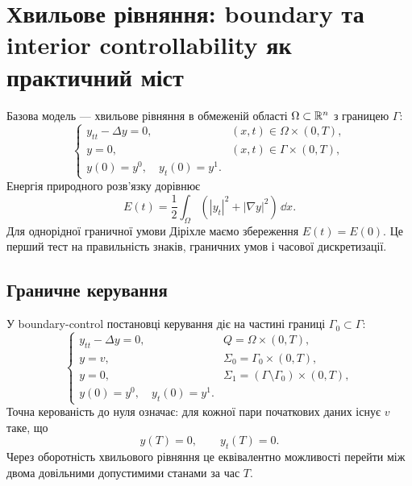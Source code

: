\chapter{Хвильове рівняння: boundary та interior controllability як практичний міст}
\label{chap:wave-boundary-interior-bridge}


Базова модель --- хвильове рівняння в обмеженій області $\Omega\subset\mathbb{R}^n$ з границею $\Gamma$:
\begin{equation}
\begin{cases}
 y_{tt}-\Delta y = 0, & (x,t)\in \Omega\times(0,T),\\
 y = 0, & (x,t)\in \Gamma\times(0,T),\\
 y(0)=y^0,\quad y_t(0)=y^1. &
\end{cases}
\end{equation}
Енергія природного розв'язку дорівнює
\begin{equation}
E(t)=\frac12\int_\Omega \left(|y_t|^2+|\nabla y|^2\right)\,\dd x.
\end{equation}
Для однорідної граничної умови Діріхле маємо збереження $E(t)=E(0)$. Це перший тест на правильність знаків, граничних умов і часової дискретизації.

\section{Граничне керування}

У boundary-control постановці керування діє на частині границі $\Gamma_0\subset\Gamma$:
\begin{equation}
\begin{cases}
 y_{tt}-\Delta y=0, & Q=\Omega\times(0,T),\\
 y=v, & \Sigma_0=\Gamma_0\times(0,T),\\
 y=0, & \Sigma_1=(\Gamma\setminus\Gamma_0)\times(0,T),\\
 y(0)=y^0,\quad y_t(0)=y^1. &
\end{cases}
\end{equation}
Точна керованість до нуля означає: для кожної пари початкових даних існує $v$ таке, що
\begin{equation}
 y(T)=0,\qquad y_t(T)=0.
\end{equation}
Через оборотність хвильового рівняння це еквівалентно можливості перейти між двома довільними допустимими станами за час $T$.

